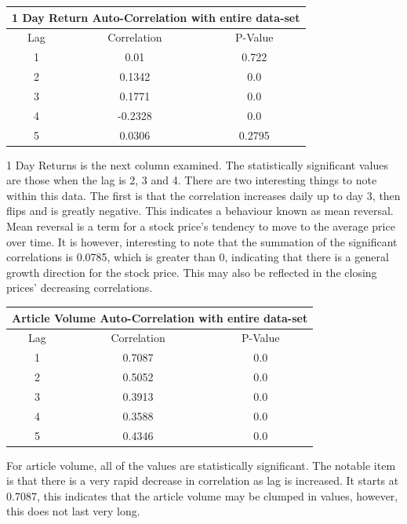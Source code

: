 \begin{center}
\begin{tabular}{ c c c }
\hline
\multicolumn{3}{|c|}{1 Day Return Auto-Correlation with entire data-set} \\
\hline
Lag & Correlation & P-Value \\
\hline
1 & 0.01 & 0.722 \\
2 & 0.1342 & 0.0 \\
3 & 0.1771 & 0.0 \\
4 & -0.2328 & 0.0 \\
5 & 0.0306 & 0.2795 \\
\end{tabular}
\end{center}
1 Day Returns is the next column examined. The statistically significant values are those when the lag is 2, 3 and 4. There are two interesting things to note within this data. The first is that the correlation increases daily up to day 3, then flips and is greatly negative. This indicates a behaviour known as mean reversal. Mean reversal is a term for a stock price's tendency to move to the average price over time. It is however, interesting to note that the summation of the significant correlations is 0.0785, which is greater than 0, indicating that there is a general growth direction for the stock price. This may also be reflected in the closing prices' decreasing correlations.

\begin{center}
\begin{tabular}{ c c c }
\hline
\multicolumn{3}{|c|}{Article Volume Auto-Correlation with entire data-set} \\
\hline
Lag & Correlation & P-Value \\
\hline
1 & 0.7087 & 0.0 \\
2 & 0.5052 & 0.0 \\
3 & 0.3913 & 0.0 \\
4 & 0.3588 & 0.0 \\
5 & 0.4346 & 0.0 \\
\end{tabular}
\end{center}
For article volume, all of the values are statistically significant. The notable item is that there is a very rapid decrease in correlation as lag is increased. It starts at 0.7087, this indicates that the article volume may be clumped in values, however, this does not last very long.

